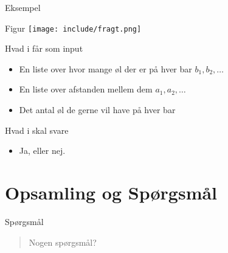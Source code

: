 \documentclass[12pt,t]{beamer}
\begin{document}
\begin{frame}[c]{Eksempel}
    \begin{block}{Figur}
      \texttt{[image: include/fragt.png]}
    \end{block}
    \pause
    \begin{block}{Hvad i får som input}
      \begin{itemize}
        \item En liste over hvor mange øl der er på hver bar $b_1, b_2, \dots$
        \item En liste over afstanden mellem dem $a_1, a_2, \dots$ \pause
        \item Det antal øl de gerne vil have på hver bar \pause
      \end{itemize}
    \end{block}

    \begin{block}{Hvad i skal svare}
      \begin{itemize}
        \item Ja, eller nej. \pause
      \end{itemize}
    \end{block}
\end{frame}

\section{Opsamling og Spørgsmål}
    \begin{frame}[c]{Spørgsmål}
        \begin{quote}
            \centering Nogen spørgsmål?
        \end{quote}
    \end{frame}
\end{document}
